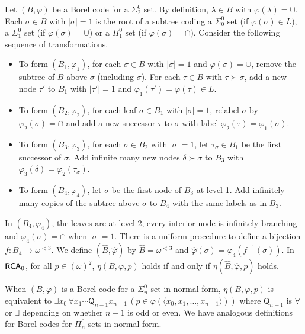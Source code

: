 \documentclass{amsart}
\theoremstyle{definition}
\theoremstyle{remark}
\newcommand{\system}[1]{\mbox{\fontfamily{cmss}\fontshape{n}\fontseries{m}%
    \selectfont#1}}
\newcommand{\RCA}{\system{RCA}\ensuremath{_0}}
\begin{document}
Let $(B,\varphi)$ be a Borel code for a $\Sigma^0_2$ set. By definition, $\lambda \in B$ with $\varphi(\lambda) = \cup$. Each $\sigma \in B$ with $|\sigma| = 1$ is the root of a subtree 
coding a $\Sigma^0_0$ set (if $\varphi(\sigma) \in L$), a $\Sigma^0_1$ set (if $\varphi(\sigma) = \cup$) or a $\Pi^0_1$ set (if $\varphi(\sigma) = \cap$). 
Consider the following sequence of transformations. 
\begin{itemize}
\item To form $(B_1, \varphi_1)$, for each $\sigma \in B$ with $|\sigma| = 1$ and 
$\varphi(\sigma) = \cup$, remove the subtree of $B$ above $\sigma$ (including $\sigma$). For each $\tau \in B$ with $\tau \succ \sigma$, add a new node $\tau'$ to $B_1$ with $|\tau'|=1$ and 
$\varphi_1(\tau') = \varphi(\tau) \in L$. 

\item To form $(B_2,\varphi_2)$, for each leaf $\sigma \in B_1$ with $|\sigma| = 1$, relabel $\sigma$ by $\varphi_2(\sigma) = \cap$ and add a new successor $\tau$ to $\sigma$ with 
label $\varphi_2(\tau) = \varphi_1(\sigma)$. 

\item To form $(B_3, \varphi_3)$, for each $\sigma \in B_2$ with $|\sigma| = 1$, let $\tau_{\sigma} \in B_1$ be the first successor of $\sigma$. Add infinite many new nodes 
$\delta \succ \sigma$ to $B_3$ with $\varphi_3(\delta) = \varphi_2(\tau_{\sigma})$. 

\item To form $(B_4, \varphi_4)$, let $\sigma$ be the first node of $B_3$ at level 1. Add infinitely many copies of the subtree above $\sigma$ to $B_4$ with 
the same labels as in $B_3$. 
\end{itemize}
In $(B_4,\varphi_4)$, the leaves are at level 2, every interior node is infinitely branching and $\varphi_4(\sigma) = \cap$ when $|\sigma| = 1$. 
There is a uniform procedure to define a bijection $f:B_4 \rightarrow \omega^{< 3}$. We define $(\widehat{B}, \widehat{\varphi})$ by $\widehat{B} = \omega^{< 3}$ and 
$\widehat{\varphi}(\sigma) = \varphi_4(f^{-1}(\sigma))$. In $\RCA$, for all $p \in (\omega)^2$, 
$\eta(B,\varphi,p)$ holds if and only if $\eta(\widehat{B}, \widehat{\varphi},p)$ holds.

When $(B,\varphi)$ is a Borel code for a $\Sigma^0_n$ set in normal form, $\eta(B,\varphi,p)$ is equivalent to 
$\exists x_0 \, \forall x_1 \cdots \mathsf{Q}_{n-1} x_{n-1} \, (p \in \varphi(\langle x_0, x_1, \ldots, x_{n-1} \rangle))$ where $\mathsf{Q}_{n-1}$ is $\forall$ or $\exists$ depending on whether  
$n-1$ is odd or even. We have analogous definitions for Borel codes for $\Pi^0_n$ sets in normal form. 
\end{document}
